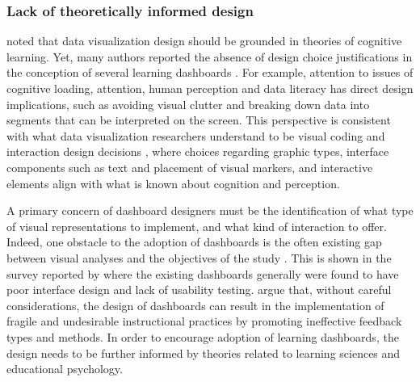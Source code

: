 \documentclass[manuscript,nonacm,12pt]{acmart}
\begin{document}
\subsubsection{Lack of theoretically informed design}
\citet{alhadad2018visualizing} noted that data visualization design should be grounded in theories of cognitive learning. Yet, many authors reported  the absence of design choice justifications in the conception of several learning dashboards \citet{Bodily2017}. For example, attention to issues of cognitive loading, attention, human perception and data literacy has direct design implications, such as avoiding visual clutter and breaking down data into segments that can be interpreted on the screen. This perspective is consistent with what data visualization researchers understand to be visual coding and interaction design decisions \citep{munzner2014visualization}, where choices regarding graphic types, interface components such as text and placement of visual markers, and interactive elements align with what is known about cognition and perception.




A primary concern of dashboard designers must be the identification of what type of visual representations to implement, and what kind of interaction to offer. Indeed, one obstacle to the adoption of dashboards is the often existing gap between visual analyses and the objectives of the study  \citep{Roberts2017}. This is shown in the survey reported by \citep{Reimers2015} where the existing dashboards generally were found to have poor interface design and lack of usability testing. 
\citet{Gavsevic2015} argue that, without careful considerations, the design of dashboards can result in the implementation of fragile and undesirable instructional practices by promoting ineffective feedback types and methods. 
In order to encourage adoption of learning dashboards, the design needs to be further informed by theories related to learning sciences and educational psychology. 
\end{document}
